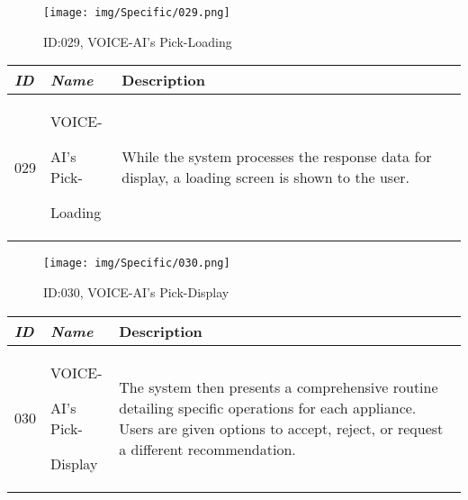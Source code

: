 \documentclass[conference]{IEEEtran}
\begin{document}
\begin{enumerate}[label=\arabic*]
    \vspace{2em}

    \begin{figure}[h]
        \centering
        \texttt{[image: img/Specific/029.png]}
        \caption{ID:029, VOICE-AI's Pick-Loading}
    \end{figure}

    \begin{table}[h]
    \def\arraystretch{1.2} \small
        \begin{tabular}{|p{1cm}|p{1.8cm}|p{4.8cm}|}
        \hline
            \textit{\textbf{ID}} & \textit{\textbf{Name}} & {\textbf{Description}} \\
        \hline
            029 \par & VOICE-\par AI's Pick-\par Loading & While the system processes the response data for display, a loading screen is shown to the user. \\
        \hline
        \end{tabular}
    \end{table}

    \newpage

    \begin{figure}[h]
        \centering
        \texttt{[image: img/Specific/030.png]}
        \caption{ID:030, VOICE-AI's Pick-Display}
    \end{figure}

    \begin{table}[h]
    \def\arraystretch{1.2} \small
        \begin{tabular}{|p{1cm}|p{1.8cm}|p{4.8cm}|}
        \hline
            \textit{\textbf{ID}} & \textit{\textbf{Name}} & {\textbf{Description}} \\
        \hline
            030 \par & VOICE-\par AI's Pick-\par Display & The system then presents a comprehensive routine detailing specific operations for each appliance. Users are given options to accept, reject, or request a different recommendation. \\
        \hline
        \end{tabular}
    \end{table}

    \vspace{2em}


\end{enumerate}
\end{document}
